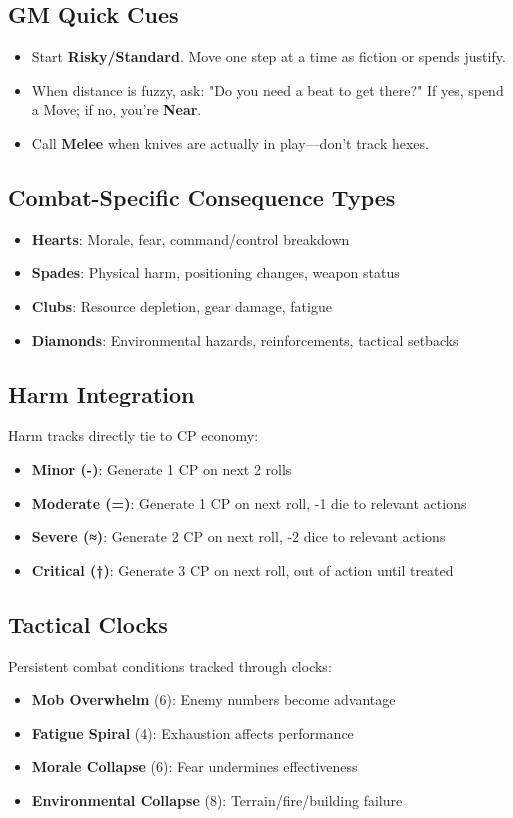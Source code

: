 \documentclass[11pt]{article}
\begin{document}
\subsection*{GM Quick Cues}
\begin{itemize}
  \item Start \textbf{Risky/Standard}. Move one step at a time as fiction or spends justify.
  \item When distance is fuzzy, ask: "Do you need a beat to get there?" If yes, spend a Move; if no, you're \textbf{Near}.
  \item Call \textbf{Melee} when knives are actually in play—don't track hexes.
\end{itemize}

\subsection{Combat-Specific Consequence Types}
\begin{itemize}
    \item \textbf{Hearts}: Morale, fear, command/control breakdown
    \item \textbf{Spades}: Physical harm, positioning changes, weapon status
    \item \textbf{Clubs}: Resource depletion, gear damage, fatigue
    \item \textbf{Diamonds}: Environmental hazards, reinforcements, tactical setbacks
\end{itemize}

\subsection{Harm Integration}
Harm tracks directly tie to CP economy:
\begin{itemize}
    \item \textbf{Minor (-)}: Generate 1 CP on next 2 rolls
    \item \textbf{Moderate (=)}: Generate 1 CP on next roll, -1 die to relevant actions
    \item \textbf{Severe (≈)}: Generate 2 CP on next roll, -2 dice to relevant actions  
    \item \textbf{Critical (†)}: Generate 3 CP on next roll, out of action until treated
\end{itemize}

\subsection{Tactical Clocks}
Persistent combat conditions tracked through clocks:
\begin{itemize}
    \item \textbf{Mob Overwhelm} (6): Enemy numbers become advantage
    \item \textbf{Fatigue Spiral} (4): Exhaustion affects performance
    \item \textbf{Morale Collapse} (6): Fear undermines effectiveness
    \item \textbf{Environmental Collapse} (8): Terrain/fire/building failure
\end{itemize}
\end{document}
